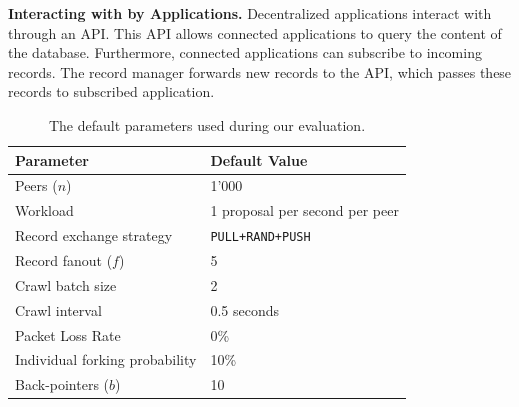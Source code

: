 
\textbf{Interacting with \ModelName{} by Applications.}
Decentralized applications interact with \ModelName{} through an API.
This API allows connected applications to query the content of the database.
Furthermore, connected applications can subscribe to incoming records.
The record manager forwards new records to the API, which passes these records to subscribed application.

\begin{table}[]
	\begin{center}
		\begin{tabular}{l l}
			\hline
			\textbf{Parameter} & \textbf{Default Value}  \\ \hline
			Peers ($ n $) & 1'000 \\
			Workload & 1 proposal per second per peer \\
			Record exchange strategy & \texttt{PULL+RAND+PUSH} \\
			Record fanout ($ f $) & 5 \\
			Crawl batch size & 2 \\
			Crawl interval & 0.5 seconds \\
			Packet Loss Rate & 0\% \\
			Individual forking probability & 10\% \\
			Back-pointers ($ b $) & 10 \\ \hline
		\end{tabular}
		\caption{The default parameters used during our evaluation.}
		\label{tab:experiment_parameters}
	\end{center}
\end{table}



